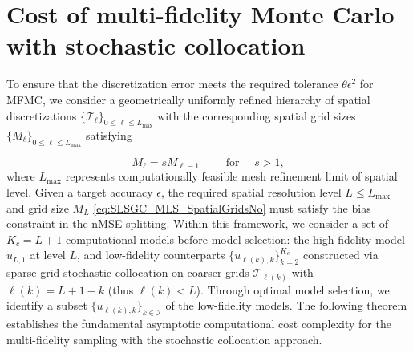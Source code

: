 


\section{Cost of multi-fidelity Monte Carlo with stochastic collocation}
\label{sec:Cost_MFMC_with_SC}
To ensure that the discretization error meets the required tolerance $\theta \epsilon^2$ for MFMC, we consider a geometrically uniformly refined hierarchy of spatial discretizations $\{\mathcal{T}_\ell\}_{0\le \ell \le L_{\max}}$ with the corresponding spatial grid sizes $\{M_\ell\}_{0\le \ell \le L_{\max}}$ satisfying 

%
\begin{equation}
\label{eq:MeshGrowth}
M_\ell = s M_{\ell-1} \qquad \text{ for }\quad  s>1,
\end{equation}
%
where $L_{\max}$  represents computationally feasible mesh refinement limit of spatial level. Given a target accuracy $\epsilon$, the required spatial resolution level $L \leq L_{\max}$ and grid size $M_L$ \eqref{eq:SLSGC_MLS_SpatialGridsNo} must satisfy the bias constraint in the nMSE splitting. Within this framework, we consider a set of $K_c = L+1$ computational models before model selection: the high-fidelity model $u_{L,1}$ at level $L$, and low-fidelity counterparts $\{u_{\ell(k),k}\}_{k=2}^{K_c}$ constructed via sparse grid stochastic collocation on coarser grids $\mathcal{T}_{\ell(k)}$ with $\ell(k) = L + 1 - k$ (thus $\ell(k) < L$). Through optimal model selection, we identify a subset $\{u_{\ell(k),k}\}_{k \in \mathcal{I}}$ of the low-fidelity models. The following theorem establishes the fundamental asymptotic computational cost complexity for the multi-fidelity sampling with the stochastic collocation approach.


